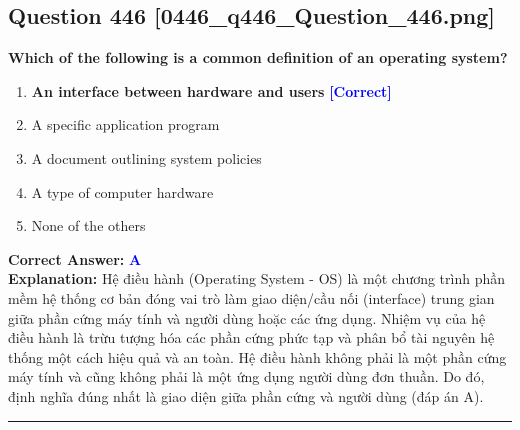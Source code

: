 \documentclass[11pt,a4paper]{article}
\begin{document}
\begin{minipage}{\textwidth}
\subsection*{Question 446 \quad \footnotesize{[0446\_q446\_Question\_446.png]}}
\noindent \textbf{Which of the following is a common definition of an operating system?}

\begin{enumerate}[label=\Alph*.]
    \item \textbf{An interface between hardware and users} \hfill \textcolor{blue}{\textbf{[Correct]}}
    \item A specific application program
    \item A document outlining system policies
    \item A type of computer hardware
    \item None of the others
\end{enumerate}

\noindent \textbf{Correct Answer:} \textcolor{blue}{\textbf{A}} \\[2pt]
\noindent \textbf{Explanation:} Hệ điều hành (Operating System - OS) là một chương trình phần mềm hệ thống cơ bản đóng vai trò làm giao diện/cầu nối (interface) trung gian giữa phần cứng máy tính và người dùng hoặc các ứng dụng. Nhiệm vụ của hệ điều hành là trừu tượng hóa các phần cứng phức tạp và phân bổ tài nguyên hệ thống một cách hiệu quả và an toàn. Hệ điều hành không phải là một phần cứng máy tính và cũng không phải là một ứng dụng người dùng đơn thuần. Do đó, định nghĩa đúng nhất là giao diện giữa phần cứng và người dùng (đáp án A).

\par\vspace{0.3cm}
\hrule
\vspace{0.3cm}
\end{minipage}
\end{document}
